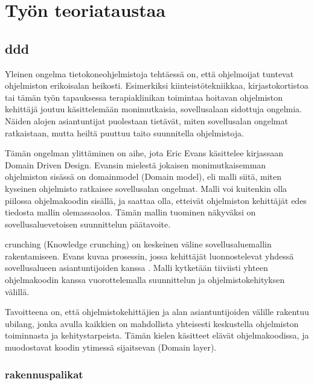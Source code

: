 \hypertarget{tyuxf6n-teoriataustaa}{%
\chapter{Työn teoriataustaa}\label{tyuxf6n-teoriataustaa}}

\hypertarget{section}{%
\section{\texorpdfstring{\gls{ddd}}{}}\label{section}}

Yleinen ongelma tietokoneohjelmistoja tehtäessä on, että ohjelmoijat
tuntevat ohjelmiston erikoisalan heikosti. Esimerkiksi
kiinteistötekniikkaa, kirjastokortistoa tai tämän työn tapauksessa
terapiaklinikan toimintaa hoitavan ohjelmiston kehittäjä joutuu
käsittelemään monimutkaisia, sovellusalaan sidottuja ongelmia. Näiden
alojen asiantuntijat puolestaan tietävät, miten sovellusalan ongelmat
ratkaistaan, mutta heiltä puuttuu taito suunnitella ohjelmistoja.

Tämän ongelman ylittäminen on aihe, jota Eric Evans käsittelee
kirjassaan Domain Driven Design.\cite{evans:ddd} Evansin mielestä
jokaisen monimutkaisemman ohjelmiston sisässä on \gls{domainmodel}
(Domain model), eli malli siitä, miten kyseinen ohjelmisto ratkaisee
sovellusalan ongelmat. Malli voi kuitenkin olla piilossa ohjelmakoodin
sisällä, ja saattaa olla, etteivät ohjelmiston kehittäjät edes tiedosta
mallin olemassaoloa. Tämän mallin tuominen näkyväksi on
sovellusaluevetoisen suunnittelun päätavoite.

\Gls{crunching} (Knowledge crunching) on keskeinen väline
sovellusaluemallin rakentamiseen. Evans kuvaa prosessin, jossa
kehittäjät luonnostelevat yhdessä sovellusalueen asiantuntijoiden kanssa
. Malli kytketään tiiviisti
yhteen ohjelmakoodin kanssa vuorottelemalla suunnittelun ja
ohjelmistokehityksen välillä. \cite[s. 13]{evans:ddd}

Tavoitteena on, että ohjelmistokehittäjien ja alan asiantuntijoiden
välille rakentuu \gls{ubilang}, jonka avulla kaikkien on mahdollista
yhteisesti keskustella ohjelmiston toiminnasta ja kehitystarpeista.
Tämän kielen käsitteet elävät ohjelmakoodissa, ja muodostavat koodin
ytimessä sijaitsevan
(Domain layer).

\hypertarget{rakennuspalikat}{%
\subsection{\texorpdfstring{
rakennuspalikat}{ rakennuspalikat}}\label{rakennuspalikat}}

